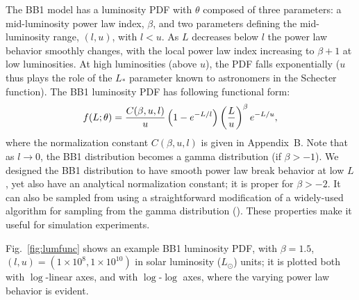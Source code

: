 The BB1 model has a luminosity PDF with $\theta$ composed of three parameters: a mid-luminosity power law index, $\beta$, and two parameters defining the mid-luminosity range, $(l, u)$, with $l < u$.
As $L$ decreases below $l$ the power law behavior smoothly changes, with the local power law index increasing to $\beta+1$ at low luminosities.
At high luminosities (above $u$), the PDF falls exponentially  ($u$ thus plays the role of the $L_*$ parameter known to astronomers in the Schecter function).
The BB1 luminosity PDF has following functional form:
\begin{equation}
\label{eq:lumPDF} 
f(L ; \theta) = 
  \frac{C(\beta,u,l)}{u}\left(1-e^{-L/l}\right) \left(\frac{L}{u}\right)^{\beta} e^{-L/u},
\end{equation}
where the normalization constant $C(\beta,u,l)$ is given in Appendix~B.
Note that as $l\rightarrow 0$, the BB1 distribution becomes a gamma distribution (if $\beta > -1$).
We designed the BB1 distribution to have smooth power law break behavior at low $L$, yet also have an analytical normalization constant;
it is proper for $\beta > -2$.
It can also be sampled from using a straightforward modification of a widely-used algorithm for sampling from the gamma distribution (\citealt{ahrens_computer_1974}).
These properties make it useful for simulation experiments.


Fig.~\ref{fig:lumfunc} shows an example BB1 luminosity PDF, with $\beta = 1.5$, $(l,u) = (1\times 10^{8}, 1\times 10^{10})$ in solar luminosity ($L_\odot$) units; it is plotted both with $\log$-linear axes, and with $\log$-$\log$ axes, where the varying power law behavior is evident.


